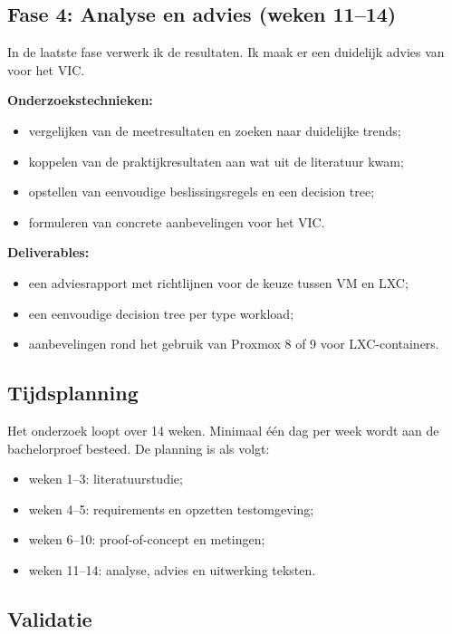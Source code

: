 \subsection{Fase 4: Analyse en advies (weken 11–14)}

In de laatste fase verwerk ik de resultaten. Ik maak er een duidelijk advies van voor het VIC.

\textbf{Onderzoekstechnieken:}
\begin{itemize}
    \item vergelijken van de meetresultaten en zoeken naar duidelijke trends;
    \item koppelen van de praktijkresultaten aan wat uit de literatuur kwam;
    \item opstellen van eenvoudige beslissingsregels en een decision tree;
    \item formuleren van concrete aanbevelingen voor het VIC.
\end{itemize}

\textbf{Deliverables:}
\begin{itemize}
    \item een adviesrapport met richtlijnen voor de keuze tussen VM en LXC;
    \item een eenvoudige decision tree per type workload;
    \item aanbevelingen rond het gebruik van Proxmox 8 of 9 voor LXC-containers.
\end{itemize}

\subsection{Tijdsplanning}

Het onderzoek loopt over 14 weken. Minimaal één dag per week wordt aan de bachelorproef besteed. De planning is als volgt:

\begin{itemize}
    \item weken 1–3: literatuurstudie;
    \item weken 4–5: requirements en opzetten testomgeving;
    \item weken 6–10: proof-of-concept en metingen;
    \item weken 11–14: analyse, advies en uitwerking teksten.
\end{itemize}

\subsection{Validatie}

